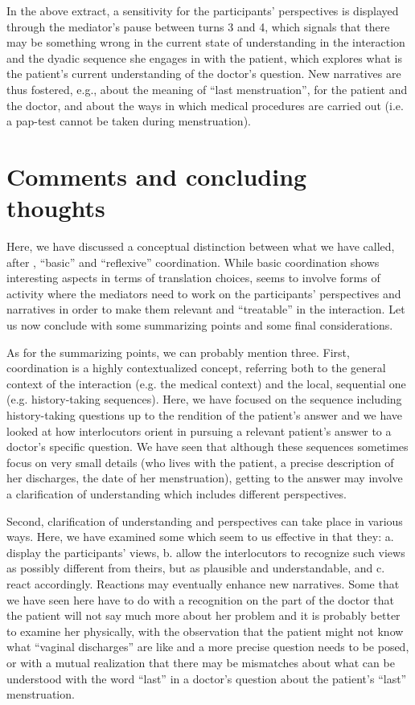 \documentclass[output=paper]{LSP/langsci}
\begin{document}
In the above extract, a sensitivity for the participants' perspectives is displayed through the mediator's pause between turns 3 and 4, which signals that there may be something wrong in the current state of understanding in the interaction and the dyadic sequence she engages in with the patient, which explores what is the patient's current understanding of the doctor's question. New narratives are thus fostered, e.g., about the meaning of ``last menstruation'', for the patient and the doctor, and about the ways in which medical procedures are carried out (i.e. a pap-test cannot be taken during menstruation).

\section{Comments and concluding thoughts}

Here, we have discussed a conceptual distinction between what we have called, after \citet{Luhmann1984}, ``basic'' and ``reflexive'' coordination. While basic coordination shows interesting aspects in terms of translation choices,  seems to involve forms of  activity where the mediators need to work on the participants' perspectives and narratives in order to make them relevant and ``treatable'' in the interaction. Let us now conclude with some summarizing points and some final considerations.

  As for the summarizing points, we can probably mention three. First, coordination is a highly contextualized concept, referring both to the general context of the interaction (e.g. the medical context) and the local, sequential one (e.g. history-taking sequences). Here, we have focused on the sequence including history-taking questions up to the rendition of the patient's answer and we have looked at how interlocutors orient in pursuing a relevant patient's answer to a doctor's specific question. We have seen that although these sequences sometimes focus on very small details (who lives with the patient, a precise description of her discharges, the date of her menstruation), getting to the answer may involve a clarification of understanding which includes different perspectives.

\newpage   
Second, clarification of understanding and perspectives can take place in various ways. Here, we have examined some which seem to us effective in that they: a. display the participants' views, b. allow the interlocutors to recognize such views as possibly different from theirs, but as plausible and understandable, and c. react accordingly. Reactions may eventually enhance new narratives. Some that we have seen here have to do with a recognition on the part of the doctor that the patient will not say much more about her problem and it is probably better to examine her physically, with the observation that the patient might not know what ``vaginal discharges'' are like and a more precise question needs to be posed, or with a mutual realization that there may be mismatches about what can be understood with the word ``last'' in a doctor's question about the patient's ``last'' menstruation. 
\end{document}
